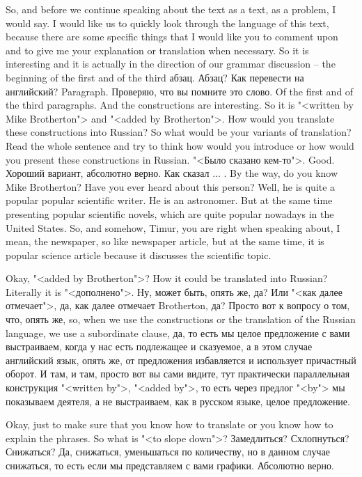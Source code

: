 \documentclass[main.tex]{subfiles}
\begin{document}
So, and before we continue speaking about the text as a text, as a problem, I would say.
I would like us to quickly look through the language of this text, because there are some specific things that I would like you to comment upon and to give me your explanation or translation when necessary.
So it is interesting and it is actually in the direction of our grammar discussion -- the beginning of the first and of the third абзац.
Абзац?
Как перевести на английский?
Paragraph.
Проверяю, что вы помните это слово.
Of the first and of the third paragraphs.
And the constructions are interesting.
So it is "<written by Mike Brotherton"> and "<added by Brotherton">.
How would you translate these constructions into Russian?
So what would be your variants of translation?
Read the whole sentence and try to think how would you introduce or how would you present these constructions in Russian.
"<Было сказано кем-то">.
Good.
Хороший вариант, абсолютно верно.
Как сказал ... .
By the way, do you know Mike Brotherton?
Have you ever heard about this person?
Well, he is quite a popular popular scientific writer.
He is an astronomer.
But at the same time presenting popular scientific novels, which are quite popular nowadays in the United States.
So, and somehow, Timur, you are right when speaking about, I mean, the newspaper, so like newspaper article, but at the same time, it is popular science article because it discusses the scientific topic.

Okay, "<added by Brotherton">?
How it could be translated into Russian?
Literally it is "<дополнено">.
Ну, может быть, опять же, да?
Или "<как далее отмечает">, да, как далее отмечает Brotherton, да?
Просто вот к вопросу о том, что, опять же, so, when we use the constructions or the translation of the Russian language, we use a subordinate clause, да, то есть мы целое предложение с вами выстраиваем, когда у нас есть подлежащее и сказуемое, а в этом случае английский язык, опять же, от предложения избавляется и использует причастный оборот.
И там, и там, просто вот вы сами видите, тут практически параллельная конструкция "<written by">, "<added by">, то есть через предлог "<by"> мы показываем деятеля, а не выстраиваем, как в русском языке, целое предложение.

Okay, just to make sure that you know how to translate or you know how to explain the phrases.
So what is "<to slope down">?
Замедлиться?
Схлопнуться?
Снижаться?
Да, снижаться, уменьшаться по количеству, но в данном случае снижаться, то есть если мы представляем с вами графики.
Абсолютно верно.
\end{document}
